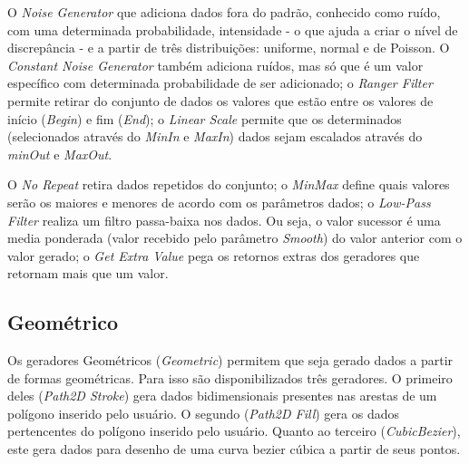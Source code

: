 \documentclass[
	12pt,				%
	openright,			%
	oneside,			%
	a4paper,			%
	english,			%
	brazil				%
	]{abntex2}
\begin{document}
			\par
				O \emph{Noise Generator} que adiciona dados fora do padrão, conhecido como ruído, com uma determinada probabilidade, intensidade - o que ajuda a criar o nível de discrepância - e a partir de três distribuições: uniforme, normal e de Poisson.
				O \emph{Constant Noise Generator} também adiciona ruídos, mas só que é um valor específico com determinada probabilidade de ser adicionado;
				o \emph{Ranger Filter} permite retirar do conjunto de dados os valores que estão entre os valores de início (\emph{Begin}) e fim (\emph{End});
				o \emph{Linear Scale} permite que os determinados (selecionados através do \emph{MinIn} e \emph{MaxIn}) dados sejam escalados através do \emph{minOut} e \emph{MaxOut}.
			\par
			O \emph{No Repeat} retira dados repetidos do conjunto;
				o \emph{MinMax} define quais valores serão os maiores e menores de acordo com os parâmetros dados;
				o \emph{Low-Pass Filter} realiza um filtro passa-baixa nos dados. Ou seja, o valor sucessor é uma media ponderada (valor recebido pelo parâmetro \emph{Smooth}) do valor anterior com o valor gerado;
				o \emph{Get Extra Value} pega os retornos extras dos geradores que retornam mais que um valor.
		\subsection{Geométrico}
			Os geradores Geométricos (\emph{Geometric}) permitem que seja gerado dados a partir de formas geométricas.
			Para isso são disponibilizados três geradores.
			O primeiro deles (\emph{Path2D Stroke}) gera dados bidimensionais presentes nas arestas de um polígono inserido pelo usuário.
			O segundo (\emph{Path2D Fill}) gera os dados pertencentes do polígono inserido pelo usuário.
			Quanto ao terceiro (\emph{CubicBezier}), este gera dados para desenho de uma curva bezier cúbica a partir de seus pontos.
\end{document}
